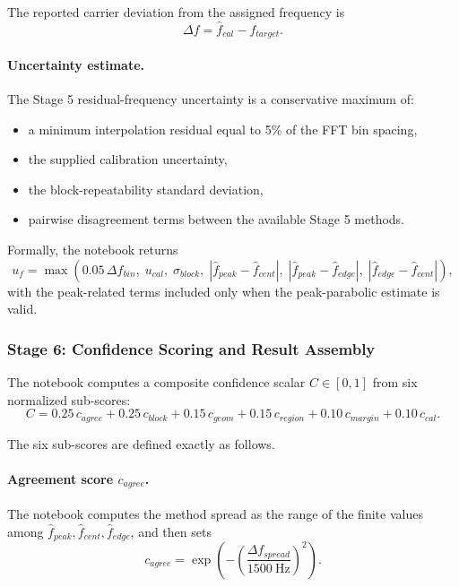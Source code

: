 \documentclass[11pt]{article}
\begin{document}
The reported carrier deviation from the assigned frequency is
\begin{equation}
\Delta f = \hat{f}_{cal} - f_{target}.
\end{equation}

\paragraph{Uncertainty estimate.}
The Stage 5 residual-frequency uncertainty is a conservative maximum of:
\begin{itemize}
    \item a minimum interpolation residual equal to 5\% of the FFT bin spacing,
    \item the supplied calibration uncertainty,
    \item the block-repeatability standard deviation,
    \item pairwise disagreement terms between the available Stage 5 methods.
\end{itemize}
Formally, the notebook returns
\begin{equation}
u_f = \max\left(0.05\, \Delta f_{bin},\; u_{cal},\; \sigma_{block},\; |\hat{f}_{peak} - \hat{f}_{cent}|,\; |\hat{f}_{peak} - \hat{f}_{edge}|,\; |\hat{f}_{edge} - \hat{f}_{cent}|\right),
\end{equation}
with the peak-related terms included only when the peak-parabolic estimate is valid.

\subsubsection*{Stage 6: Confidence Scoring and Result Assembly}

The notebook computes a composite confidence scalar $C \in [0, 1]$ from six normalized sub-scores:
\begin{equation}
C = 0.25\, c_{agree} + 0.25\, c_{block} + 0.15\, c_{geom} + 0.15\, c_{region} + 0.10\, c_{margin} + 0.10\, c_{cal}.
\end{equation}

The six sub-scores are defined exactly as follows.

\paragraph{Agreement score $c_{agree}$.}
The notebook computes the method spread as the range of the finite values among $\hat{f}_{peak}, \hat{f}_{cent}, \hat{f}_{edge}$, and then sets
\begin{equation}
c_{agree} = \exp\left(-\left(\frac{\Delta f_{spread}}{1500~\text{Hz}}\right)^2\right).
\end{equation}
\end{document}
